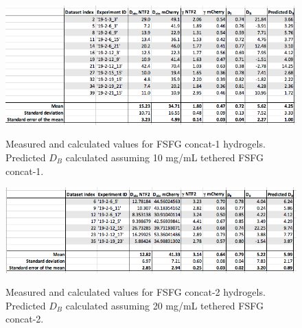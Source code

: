\begin{figure}
\caption[FSFG concat-1 hydrogel dataset.]{Measured and calculated values for FSFG concat-1 hydrogels.  Predicted $D_B$ calculated assuming 10 mg/mL tethered FSFG concat-1.}
\centering
\includegraphics[width=\textwidth]{figs/apps/dataset-cct1.png}
\label{fig:cct1}
\end{figure} 

\begin{figure}
\caption[FSFG concat-2 hydrogel dataset.]{Measured and calculated values for FSFG concat-2 hydrogels. Predicted $D_B$ calculated assuming 20 mg/mL tethered FSFG concat-2.}
\centering
\includegraphics[width=\textwidth]{figs/apps/dataset-cct2.png}
\label{fig:cct2}
\end{figure} 